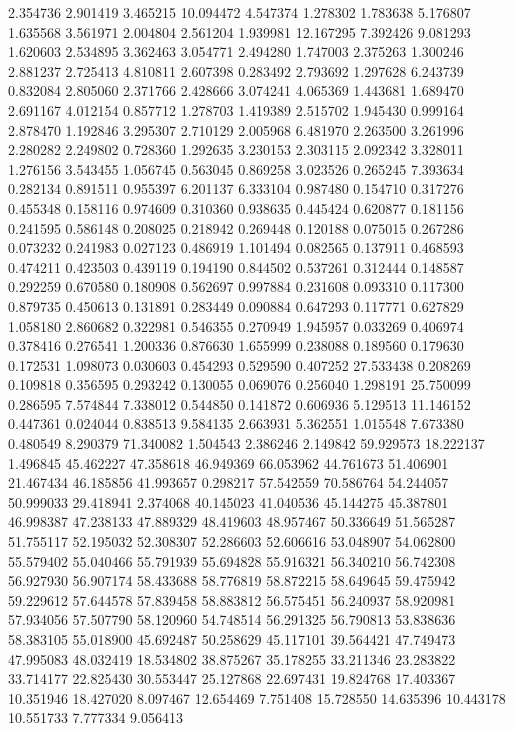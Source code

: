 2.354736
2.901419
3.465215
10.094472
4.547374
1.278302
1.783638
5.176807
1.635568
3.561971
2.004804
2.561204
1.939981
12.167295
7.392426
9.081293
1.620603
2.534895
3.362463
3.054771
2.494280
1.747003
2.375263
1.300246
2.881237
2.725413
4.810811
2.607398
0.283492
2.793692
1.297628
6.243739
0.832084
2.805060
2.371766
2.428666
3.074241
4.065369
1.443681
1.689470
2.691167
4.012154
0.857712
1.278703
1.419389
2.515702
1.945430
0.999164
2.878470
1.192846
3.295307
2.710129
2.005968
6.481970
2.263500
3.261996
2.280282
2.249802
0.728360
1.292635
3.230153
2.303115
2.092342
3.328011
1.276156
3.543455
1.056745
0.563045
0.869258
3.023526
0.265245
7.393634
0.282134
0.891511
0.955397
6.201137
6.333104
0.987480
0.154710
0.317276
0.455348
0.158116
0.974609
0.310360
0.938635
0.445424
0.620877
0.181156
0.241595
0.586148
0.208025
0.218942
0.269448
0.120188
0.075015
0.267286
0.073232
0.241983
0.027123
0.486919
1.101494
0.082565
0.137911
0.468593
0.474211
0.423503
0.439119
0.194190
0.844502
0.537261
0.312444
0.148587
0.292259
0.670580
0.180908
0.562697
0.997884
0.231608
0.093310
0.117300
0.879735
0.450613
0.131891
0.283449
0.090884
0.647293
0.117771
0.627829
1.058180
2.860682
0.322981
0.546355
0.270949
1.945957
0.033269
0.406974
0.378416
0.276541
1.200336
0.876630
1.655999
0.238088
0.189560
0.179630
0.172531
1.098073
0.030603
0.454293
0.529590
0.407252
27.533438
0.208269
0.109818
0.356595
0.293242
0.130055
0.069076
0.256040
1.298191
25.750099
0.286595
7.574844
7.338012
0.544850
0.141872
0.606936
5.129513
11.146152
0.447361
0.024044
0.838513
9.584135
2.663931
5.362551
1.015548
7.673380
0.480549
8.290379
71.340082
1.504543
2.386246
2.149842
59.929573
18.222137
1.496845
45.462227
47.358618
46.949369
66.053962
44.761673
51.406901
21.467434
46.185856
41.993657
0.298217
57.542559
70.586764
54.244057
50.999033
29.418941
2.374068
40.145023
41.040536
45.144275
45.387801
46.998387
47.238133
47.889329
48.419603
48.957467
50.336649
51.565287
51.755117
52.195032
52.308307
52.286603
52.606616
53.048907
54.062800
55.579402
55.040466
55.791939
55.694828
55.916321
56.340210
56.742308
56.927930
56.907174
58.433688
58.776819
58.872215
58.649645
59.475942
59.229612
57.644578
57.839458
58.883812
56.575451
56.240937
58.920981
57.934056
57.507790
58.120960
54.748514
56.291325
56.790813
53.838636
58.383105
55.018900
45.692487
50.258629
45.117101
39.564421
47.749473
47.995083
48.032419
18.534802
38.875267
35.178255
33.211346
23.283822
33.714177
22.825430
30.553447
25.127868
22.697431
19.824768
17.403367
10.351946
18.427020
8.097467
12.654469
7.751408
15.728550
14.635396
10.443178
10.551733
7.777334
9.056413
